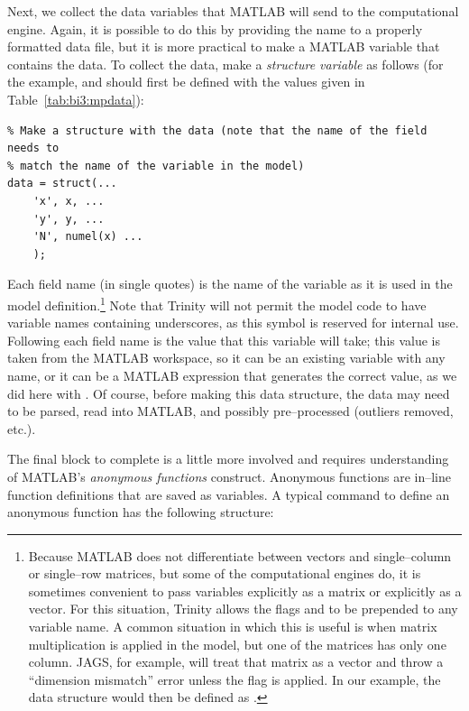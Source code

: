 Next, we collect the data variables that MATLAB will send to the computational engine. Again, it is possible to do this by providing the name to a properly formatted data file, but it is more practical to make a MATLAB variable that contains the data. To collect the data, make a \emph{structure variable} as follows (for the example,  and  should first be defined with the values given in Table~\ref{tab:bi3:mpdata}):

\begin{lstlisting}
% Make a structure with the data (note that the name of the field needs to
% match the name of the variable in the model)
data = struct(...
    'x', x, ...
    'y', y, ...
    'N', numel(x) ...
    );
\end{lstlisting}
Each field name (in single quotes) is the name of the variable as it is used in the model definition.\footnote{Because MATLAB does not differentiate between vectors and single--column or single--row matrices, but some of the computational engines do, it is sometimes convenient to pass variables explicitly as a matrix or explicitly as a vector. For this situation, Trinity allows the flags  and  to be prepended to any variable name. A common situation in which this is useful is when matrix multiplication is applied in the model, but one of the matrices has only one column. JAGS, for example, will treat that matrix as a vector and throw a ``dimension mismatch'' error unless the flag is applied. In our example, the data structure would then be defined as .} Note that Trinity will not permit the model code to have variable names containing underscores, as this symbol is reserved for internal use. Following each field name is the value that this variable will take; this value is taken from the MATLAB workspace, so it can be an existing variable with any name, or it can be a MATLAB expression that generates the correct value, as we did here with . Of course, before making this data structure, the data may need to be parsed, read into MATLAB, and possibly pre--processed (outliers removed, etc.).

The final block to complete is a little more involved and requires understanding of MATLAB's \emph{anonymous functions} construct. Anonymous functions are in--line function definitions that are saved as variables. A typical command to define an anonymous function has the following structure:

